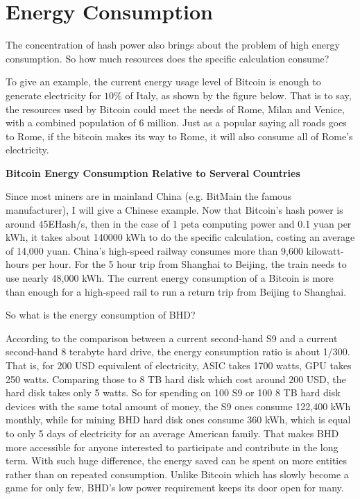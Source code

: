 \section{Energy Consumption}
\begin{flushleft}
    The concentration of hash power also brings about the problem of high energy consumption. So how much resources does the specific calculation consume?
\end{flushleft}
\begin{flushleft}
    To give an example, the current energy usage level of Bitcoin is enough to generate electricity for $10\%$ of Italy, as shown by the figure below. That is to say, the resources used by Bitcoin could meet the needs of Rome, Milan and Venice, with a combined population of 6 million. Just as a popular saying all roads goes to Rome, if the bitcoin makes its way to Rome, it will also consume all of Rome's electricity.
\end{flushleft}
\begin{flushleft}
    \centering\textbf{Bitcoin Energy Consumption Relative to Serveral Countries}
\end{flushleft}

\begin{flushleft}
    Since most miners are in mainland China (e.g. BitMain the famous manufacturer), I will give a Chinese example. Now that Bitcoin's hash power is around 45EHash/s, then in the case of 1 peta computing power and 0.1 yuan per kWh, it takes about 140000 kWh to do the specific calculation, costing an average of 14,000 yuan. China's high-speed railway consumes more than 9,600 kilowatt-hours per hour. For the 5 hour trip from Shanghai to Beijing, the train needs to use nearly 48,000 kWh. The current energy consumption of a Bitcoin is more than enough for a high-speed rail to run a return trip from Beijing to Shanghai.
\end{flushleft}
\begin{flushleft}
    So what is the energy consumption of BHD?
\end{flushleft}
\begin{flushleft}
    According to the comparison between a current second-hand S9 and a current second-hand 8 terabyte hard drive, the energy consumption ratio is about 1/300. That is, for 200 USD equivalent of electricity, ASIC takes 1700 watts, GPU takes 250 watts. Comparing those to 8 TB hard disk which cost around 200 USD, the hard disk takes only 5 watts. So for spending on 100 S9 or 100 8 TB hard disk devices with the same total amount of money, the S9 ones consume 122,400 kWh monthly, while for mining BHD hard disk ones consume 360 kWh, which is equal to only 5 days of electricity for an average American family. That makes BHD more accessible for anyone interested to participate and contribute in the long term. With such huge difference, the energy saved can be spent on more entities rather than on repeated consumption. Unlike Bitcoin which has slowly become a game for only few, BHD’s low power requirement keeps its door open for many.
\end{flushleft}
